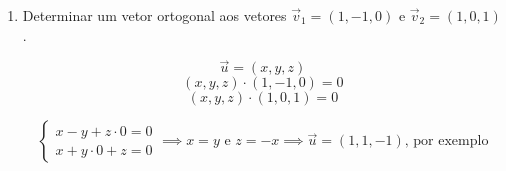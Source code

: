 \documentclass[
  12pt,
  openright,
  a4paper,
  twoside,
  english,
  brazil,
]{article}
\begin{document}
\begin{enumerate}[\bfseries  1.]
    $$
    \overrightarrow{AB}=(2-2,1-3,-1-1)=(0,-2,-2)
    $$
    $$
    \overrightarrow{AC}=(2-2,2-3,-2-1)=(0,-1,-3)
    $$
    $$
    \overrightarrow{BC}=(2-2,2-1,-2-(-1))=(0,1,-1)
    $$
    $$
    ||\overrightarrow{AB}||=\sqrt{0^2+(-2)^2+(-2)^2}=2\sqrt{2}
    $$
    $$
    ||\overrightarrow{AC}||=\sqrt{0^2+(-1)^2+(-3)^2}=\sqrt{10}
    $$
    $$
    ||\overrightarrow{BC}||=\sqrt{0^2+1^2+(-1)^2}=\sqrt{2}
    $$

    $$
    \theta_1=B\hat AC\implies \cos(\theta_1)=\frac{0\cdot
    0+(-2)(-1)+(-2)(-3)}{2\sqrt 2\cdot \sqrt{10}}
    $$
    $$
    \cos(\theta_1)=\frac{8}{4\sqrt 5}=\frac{2}{\sqrt 5}\implies
    \theta_1=26.56\degree
    $$

    $$
    \theta_2=A\hat BC\implies \cos(\theta_2)=\frac{-(0,-2,-2)\cdot
    (0,1,-1)}{2\sqrt 2\cdot\sqrt 2}
    $$
    $$
    \cos(\theta_2)=\frac{0\cdot0+2\cdot1+2\cdot(-1)}{4}=0\implies
    \theta_2=90\degree
    $$

  \item Determinar um vetor ortogonal aos vetores $\vec v_1=(1,-1,0)$
    e $\vec v_2=(1,0,1)$.

    $$
    \vec u =(x,y,z)
    $$
    $$
    (x,y,z)\cdot(1,-1,0)=0
    $$
    $$
    (x,y,z)\cdot(1,0,1)=0
    $$

    $$
    \begin{cases}
      x-y+z\cdot0=0\\
      x+y\cdot0+z=0
    \end{cases}\implies x = y\text{ e }z=-x
    \implies \vec u=(1,1,-1)\text{, por exemplo}
    $$

\end{enumerate}
\end{document}
